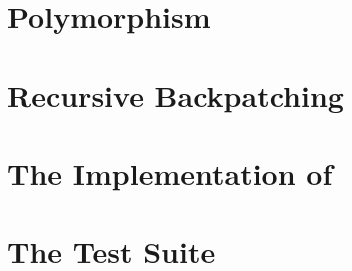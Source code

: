 \chapter{Polymorphism}
\label{ch:polymorphism}


\chapter{Recursive Backpatching}
\label{ch:recursive-backpatching}


\appendix

\chapter{The Implementation of \texorpdfstring{\myth{}}{Myth}}
\label{app:the-implementation-of-myth}


\chapter{The \texorpdfstring{\myth{}}{Myth} Test Suite}
\label{app:the-myth-test-suite}

